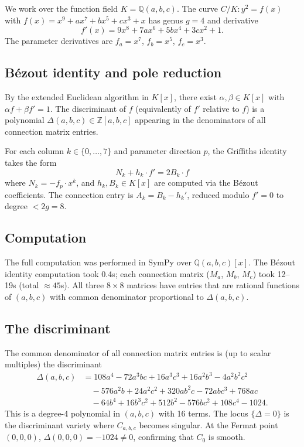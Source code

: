 \documentclass[11pt,a4paper]{article}
\theoremstyle{definition}
\theoremstyle{remark}
\newcommand{\ZZ}{\mathbb{Z}}
\newcommand{\QQ}{\mathbb{Q}}
\begin{document}
We work over the function field $K = \QQ(a,b,c)$.
The curve $C/K: y^2 = f(x)$ with $f(x) = x^9 + ax^7 + bx^5 + cx^3 + x$
has genus $g = 4$ and derivative
\[
  f'(x) = 9x^8 + 7ax^6 + 5bx^4 + 3cx^2 + 1.
\]
The parameter derivatives are $f_a = x^7$, $f_b = x^5$, $f_c = x^3$.

\subsection{B\'ezout identity and pole reduction}

By the extended Euclidean algorithm in $K[x]$, there exist $\alpha, \beta \in K[x]$
with $\alpha f + \beta f' = 1$.
The discriminant of $f$ (equivalently of $f'$ relative to $f$) is a polynomial
$\Delta(a,b,c) \in \ZZ[a,b,c]$ appearing in the denominators of all connection
matrix entries.

For each column $k \in \{0, \ldots, 7\}$ and parameter direction $p$, the
Griffiths identity takes the form
\[
  N_k + h_k \cdot f' = 2 B_k \cdot f
\]
where $N_k = -f_p \cdot x^k$, and $h_k, B_k \in K[x]$ are computed via
the B\'ezout coefficients.
The connection entry is $A_k = B_k - h_k'$, reduced modulo $f' = 0$
to degree $< 2g = 8$.

\subsection{Computation}

The full computation was performed in SymPy over $\QQ(a,b,c)[x]$.
The B\'ezout identity computation took 0.4s; each connection matrix
($M_a$, $M_b$, $M_c$) took 12--19s (total $\approx 45$s).
All three $8 \times 8$ matrices have entries that are rational functions
of $(a,b,c)$ with common denominator proportional to $\Delta(a,b,c)$.

\subsection{The discriminant}

The common denominator of all connection matrix entries is (up to scalar multiples)
the discriminant
\begin{align*}
  \Delta(a,b,c) &= 108a^4 - 72a^3bc + 16a^3c^3 + 16a^2b^3 - 4a^2b^2c^2 \\
  &\quad - 576a^2b + 24a^2c^2 + 320ab^2c - 72abc^3 + 768ac \\
  &\quad - 64b^4 + 16b^3c^2 + 512b^2 - 576bc^2 + 108c^4 - 1024.
\end{align*}
This is a degree-4 polynomial in $(a,b,c)$ with 16 terms.
The locus $\{\Delta = 0\}$ is the discriminant variety where $C_{a,b,c}$
becomes singular.
At the Fermat point $(0,0,0)$, $\Delta(0,0,0) = -1024 \neq 0$,
confirming that $C_0$ is smooth.
\end{document}
